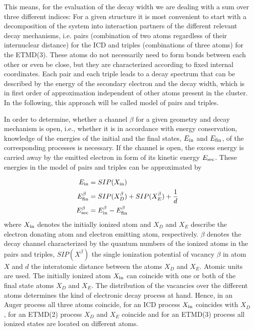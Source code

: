 \documentclass[journal=jpccck,manuscript=article]{achemso}
\begin{document}
This means, for the evaluation of the decay width we are dealing with a sum over three different indices: 
For a given structure it is most convenient to
start with a decomposition of the system into interaction partners of
the different relevant decay mechanisms, i.e. pairs (combination of two atoms regardless
of their internuclear distance) for the ICD and triples (combinations of three atoms)
for the ETMD(3).
These atoms do not necessarily need to form bonds between each other or
even be close, but they are characterized according to fixed internal
coordinates. 
Each pair and each triple leads to a decay spectrum that can be described by the energy of the secondary electron and the decay width, which is in first order of approximation independent of other atoms present in the cluster.
In the following, this approach will be called model of pairs and triples.


In order to determine, whether a channel $\beta$ for a given geometry and decay
mechanism is open, i.e., whether it is in accordance with energy conservation,
knowledge of the energies of the initial and the final states, $E_{\rm in}$ and $E_{\rm fin}$, of
the corresponding processes is necessary.
If the channel
is open, the excess energy is carried away by the emitted electron
in form of its kinetic energy $E_{\rm sec}$. These energies in the model
of pairs and triples can be approximated by

\begin{align}
 E_{\rm in}        &= SIP(X_{\rm in}) \label{equation:E_in}\\
 E_{\rm fin}^\beta &= SIP(X_{D}^\beta) + SIP(X_{E}^\beta) + \frac 1d
           \label{equation:E_fin}\\
 E_{\rm sec}^\beta &= E_{\rm in}^\beta - E_{\rm fin}^\beta \label{equation:E_sec}
\end{align}
where $X_{\rm in}$ denotes the initially ionized atom and
$X_{D}$ and $X_{E}$ describe the electron donating atom and electron
emitting atom, respectively.
$\beta$ denotes the decay channel characterized by the quantum numbers of the ionized atoms in the pairs and triples, $SIP(X^\beta)$ the single ionization potential of vacancy $\beta$ in atom $X$ and $d$ the interatomic distance between the atoms $X_{D}$ and $X_{E}$. 
Atomic units are used.
The initially ionized atom $X_{\rm in}$ can
coincide with one or both of
the final state atoms
$X_{D}$ and $X_{E}$.
The distribution of the vacancies over the different
atoms determines the kind of electronic decay process at hand. Hence, in an
Auger process all three atoms coincide, for an ICD process $X_{\rm in}$
coincides with $X_{D}$, for an ETMD(2) process $X_D$ and $X_E$ coincide
and for an ETMD(3) process
all ionized states are located on different atoms.
\end{document}
